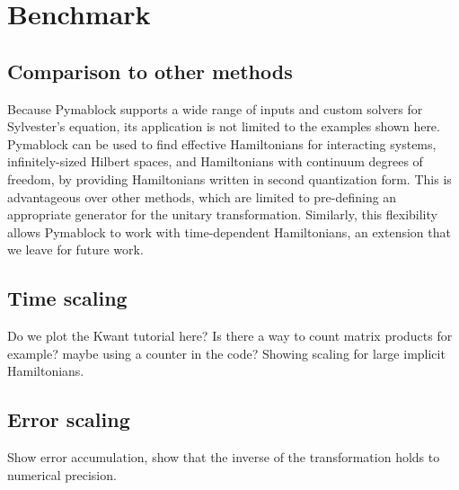 \section{Benchmark}

\subsection{Comparison to other methods}

Because Pymablock supports a wide range of inputs and custom solvers for
Sylvester's equation, its application is not limited to the examples shown
here.
Pymablock can be used to find effective Hamiltonians for interacting systems,
infinitely-sized Hilbert spaces, and Hamiltonians with continuum degrees of
freedom, by providing Hamiltonians written in second quantization form.
This is advantageous over other methods, which are limited to pre-defining
an appropriate generator for the unitary transformation.
Similarly, this flexibility allows Pymablock to work with time-dependent
Hamiltonians, an extension that we leave for future work.

\subsection{Time scaling}

Do we plot the Kwant tutorial here? Is there a way to count matrix products for
example? maybe using a counter in the code?
Showing scaling for large implicit Hamiltonians.

\subsection{Error scaling}

Show error accumulation, show that the inverse of the transformation holds to numerical precision.
